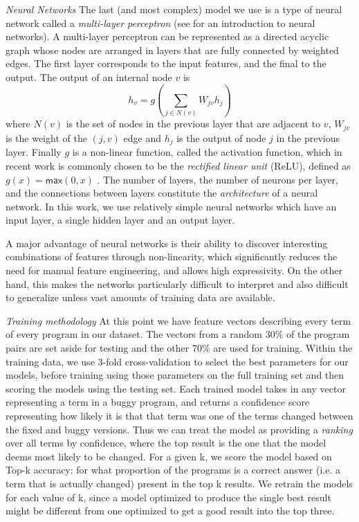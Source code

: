 \documentclass[conference]{IEEEtran}
\begin{document}
\emph{Neural Networks}
%
The last (and most complex) model we use is a type of neural network
called a \emph{multi-layer perceptron} (see \cite{Nielsen2015-pu} for
an introduction to neural networks).
%
A multi-layer perceptron can be represented as a directed acyclic
graph whose nodes are arranged in layers that are fully connected by
weighted edges.
%
The first layer corresponds to the input features, and the final to the
output.
%
The output of an internal node $v$ is
%
\[ h_v = g(\sum_{j \in N(v)} W_{jv} h_j ) \]
%
where $N(v)$ is the set of nodes in the previous layer that are adjacent
to $v$, $W_{jv}$ is the weight of the $(j, v)$ edge and $h_j$ is the
output of node $j$ in the previous layer.
%
Finally $g$ is a non-linear function, called the activation function,
which in recent work is commonly chosen to be the \emph{rectified linear
  unit} (ReLU), defined as $g(x) = \mathsf{max}(0,x)$
\cite{Nair2010-xg}.
%
The number of layers, the number of neurons per layer, and the
connections between layers constitute the \emph{architecture} of a
neural network.
%
In this work, we use relatively simple neural networks which have an
input layer, a single hidden layer and an output layer.

A major advantage of neural networks is their ability to discover
interesting combinations of features through non-linearity, which
significantly reduces the need for manual feature engineering, and
allows high expressivity.
%
On the other hand, this makes the networks particularly difficult to
interpret and also difficult to generalize unless vast amounts of
training data are available.

\emph{Training methodology} At this point we have feature vectors describing every term of every program in
our dataset. The vectors from a random 30\% of the program pairs are set aside for testing and
the other 70\% are used for training. Within the training data, we use 3-fold
cross-validation to select the best parameters for our models, before training
using those parameters on the full training set and then scoring the models
using the testing set. Each trained model takes in any vector representing a term
in a buggy program, and returns a confidence score representing how likely it is that
that term was one of the terms changed between the fixed and buggy versions.
Thus we can treat the model as providing a \emph{ranking} over all terms by
confidence, where the top result is the one that the model deems most likely
to be changed. For
a given k, we score the model based on Top-k accuracy: for what proportion of the
programs is a correct answer (i.e. a term that is actually changed) present in the
top k results. We retrain the models for each value of k, since a model optimized
to produce the single best result might be different from one optimized to get a
good result into the top three.
\end{document}
